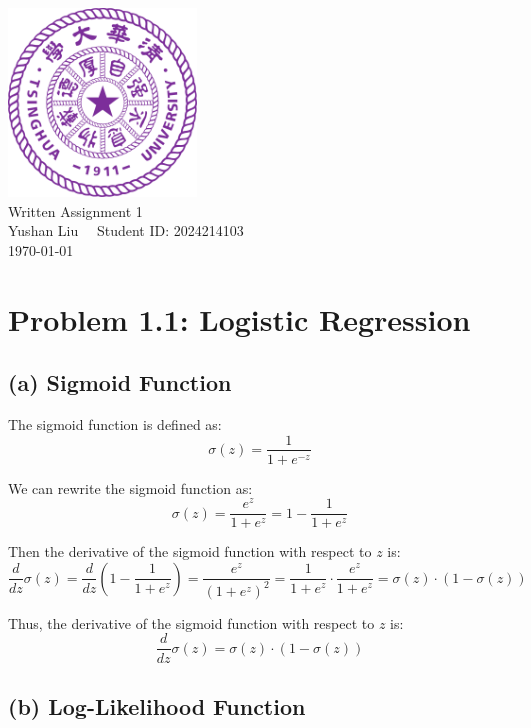\documentclass[12pt]{article}
\begin{document}
\begin{titlepage}
    \begin{center}
        \includegraphics[width=5cm]{tsinghua_logo.png}\\[4cm]  %
        {\Huge Written Assignment 1} \\[2cm]
        {\large Yushan Liu  \ \  Student ID: 2024214103}\\[6cm]
        {\normalsize \today}\\[1cm]
    \end{center}
\end{titlepage}

\section*{Problem 1.1: Logistic Regression}

\subsection*{(a) Sigmoid Function}

The sigmoid function is defined as:
\[
    \sigma(z) = \frac{1}{1 + e^{-z}}
\]

We can rewrite the sigmoid function as:
\[
    \sigma(z) = \frac{e^z}{1 + e^z} = 1 - \frac{1}{1 + e^z}
\]

Then the derivative of the sigmoid function with respect to \( z \) is:
\[
    \frac{d}{dz} \sigma(z) = \frac{d}{dz} \left( 1 - \frac{1}{1 + e^z} \right) = \frac{e^z}{(1 + e^z)^2} = \frac{1}{1 + e^z} \cdot \frac{e^z}{1 + e^z} = \sigma(z) \cdot (1 - \sigma(z))
\]

Thus, the derivative of the sigmoid function with respect to \( z \) is:
\[
    \frac{d}{dz} \sigma(z) = \sigma(z) \cdot (1 - \sigma(z))
\]

\subsection*{(b) Log-Likelihood Function}
\end{document}
